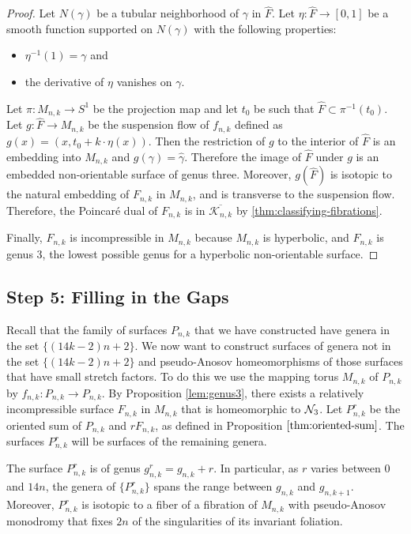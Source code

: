 \begin{proof}
  Let $N(\gamma)$ be a tubular neighborhood of $\gamma$ in $\widehat{F}$.  Let $\eta: \widehat{F} \xrightarrow{} [0,1]$ be a smooth function supported on $N(\gamma)$ with the following properties:
  \begin{itemize}
      \item $\eta^{-1}(1) = \gamma$ and
      \item the derivative of $\eta$ vanishes on $\gamma$.
    \end{itemize}
Let $\pi:M_{n,k}\rightarrow S^1$ be the projection map and let $t_0$ be such that $\widehat{F}\subset\pi^{-1}(t_0)$.  Let $g: \widehat{F} \xrightarrow{} M_{n,k}$ be the suspension flow of $f_{n,k}$ defined as $g(x) =(x,t_0+k\cdot\eta(x))$. Then the restriction of $g$ to the interior of $\widehat{F}$ is an embedding into $M_{n,k}$ and $g(\gamma) = \widehat{\gamma}$. Therefore the image of $\widehat{F}$ under $g$ is an embedded non-orientable surface of genus three. Moreover, $g(\widehat{F})$ is isotopic to the natural embedding of $F_{n,k}$ in $M_{n,k}$, and is transverse to the suspension flow.
  Therefore, the Poincar\'e dual of $F_{n,k}$ is in $\overline{\mathcal{K}_{n,k}}$ by \autoref{thm:classifying-fibrations}.

  Finally, $F_{n,k}$ is incompressible in $M_{n,k}$ because $M_{n,k}$ is hyperbolic, and $F_{n,k}$ is genus $3$, the
  lowest possible genus for a hyperbolic non-orientable surface.
\end{proof}



\subsection*{Step 5: Filling in the Gaps}
Recall that the family of surfaces $P_{n,k}$ that we have constructed have genera in the set $\{(14k-2)n+2\}$.
We now want to construct surfaces of genera not in the set $\{(14k-2)n+2\}$ and pseudo-Anosov homeomorphisms of those surfaces that have small stretch factors.  To do this we use the mapping torus $M_{n,k}$ of $P_{n,k}$ by $f_{n,k}:P_{n,k}\to P_{n,k}$. By Proposition \ref{lem:genus3}, there exists a relatively incompressible surface $F_{n,k}$ in $M_{n,k}$ that is homeomorphic to $\mathcal{N}_3$.  Let $P_{n,k}^r$ be the oriented sum of $P_{n,k}$ and
$rF_{n,k}$, as defined in Proposition $\ref{thm:oriented-sum}$.  The surfaces $P_{n,k}^r$ will be surfaces of the remaining genera.

\begin{lem}
  The surface $P^r_{n,k}$ is of genus $g^r_{n,k} = g_{n,k} + r$. In particular, as $r$ varies between
  $0$ and $14n$, the genera of $\{P^r_{n,k}\}$ spans the range between $g_{n,k}$ and $g_{n,k+1}$. Moreover,
  $P^r_{n,k}$ is isotopic to a fiber of a fibration of $M_{n,k}$ with pseudo-Anosov monodromy that fixes $2n$
  of the singularities of its invariant foliation.
\end{lem}

